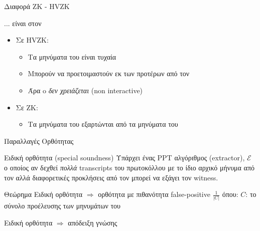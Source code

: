 \documentclass[handout]{beamer}
\begin{document}
\begin{frame}{Διαφορά ZK - HVZK}
    \begin{block}{... είναι στον \ver}
    \begin{itemize}
        \item Σε HVZK:
        \begin{itemize}
            \item Τα μηνύματα του \ver είναι τυχαία 
            \item Μπορούν να προετοιμαστούν εκ των προτέρων  από τον \siml
            \item Άρα o \ver \emph{δεν χρειάζεται} (non interactive)
        \end{itemize} 
        \item Σε ZK:
        \begin{itemize}
            \item Τα μηνύματα του \ver εξαρτώνται από τα μηνύματα του \prv
        \end{itemize}
    \end{itemize}    
    \end{block}
\end{frame}

\begin{frame}{Παραλλαγές Ορθότητας}
\begin{block}{Ειδική ορθότητα (special soundness)}
Υπάρχει ένας PPT αλγόριθμος (extractor), $\mathcal{E}$ ο οποίος αν δεχθεί \emph{πολλά} transcripts του πρωτοκόλλου με το ίδιο αρχικό μήνυμα από τον \prv αλλά διαφορετικές προκλήσεις από τον \ver μπορεί να εξάγει τον witness.
\end{block}
\pause
\begin{block}{Θεώρημα}
Ειδική ορθότητα $\Rightarrow$ ορθότητα με πιθανότητα false-positive $\frac{1}{|C|}$ όπου:
$C$: το σύνολο προέλευσης των μηνυμάτων του \ver

Ειδική ορθότητα $\Rightarrow$ απόδειξη γνώσης
\end{block}


\end{frame}
\end{document}
